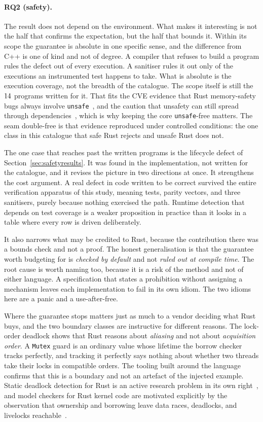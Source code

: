 \documentclass[english,oneside,a4paper,censored,csm,software-track-2020]{HYthesisML}
\begin{document}
\paragraph{RQ2 (safety).} The result does not depend on the environment. What makes it
interesting is not the half that confirms the expectation, but the half that bounds it. Within
its scope the guarantee is absolute in one specific sense, and the difference from C++ is one of
kind and not of degree. A compiler that refuses to build a program rules the defect out of
every execution. A sanitiser rules it out only of the executions an instrumented test
happens to take. What is absolute is the execution coverage, not the breadth of the catalogue.
The scope itself is still the $14$ programs written for it.
That fits the CVE evidence that Rust memory-safety bugs always involve
\texttt{unsafe}~\cite{xu2021rustcve}, and the caution that unsafety can still spread
through dependencies~\cite{evans2020rust}, which is why keeping the core \texttt{unsafe}-free
matters. The seam double-free is that evidence reproduced under controlled conditions: the one
class in this catalogue that safe Rust rejects and unsafe Rust does not.

The one case that reaches past the written programs is the lifecycle defect of
Section~\ref{sec:safetyresults}. It was found in the implementation, not written for
the catalogue, and it revises the picture in two directions at once. It strengthens the cost
argument. A real defect in code written to be correct survived the entire verification
apparatus of this study, meaning tests, parity vectors, and three sanitisers, purely because
nothing exercised the path. Runtime detection that depends on test coverage is a weaker
proposition in practice than it looks in a table where every row is driven deliberately.

It also
narrows what may be credited to Rust, because the contribution there was a bounds check and not
a proof. The honest generalisation is that
the guarantee worth budgeting for is \emph{checked by default} and not \emph{ruled out at
compile time}. The root cause is worth naming too, because it is a risk of the method
and not of either language. A specification that states a prohibition without assigning a
mechanism leaves each implementation to fail in its own idiom. The two idioms here are a
panic and a use-after-free.

Where the guarantee stops matters just as much to a vendor deciding what Rust buys, and the two
boundary classes are instructive for different reasons. The lock-order deadlock shows that Rust
reasons about \emph{aliasing} and not about \emph{acquisition order}. A \texttt{Mutex} guard is an
ordinary value whose lifetime the borrow checker tracks perfectly, and tracking it perfectly
says nothing about whether two threads take their locks in compatible orders. The tooling built
around the language confirms that this is a boundary and not an artefact of the injected example.
Static deadlock detection for Rust is an active research problem
in its own right~\cite{zhang2026deadlock}, and model checkers for Rust kernel code are motivated
explicitly by the observation that ownership and borrowing leave data races, deadlocks, and
livelocks reachable~\cite{tang2025converos}.
\end{document}
